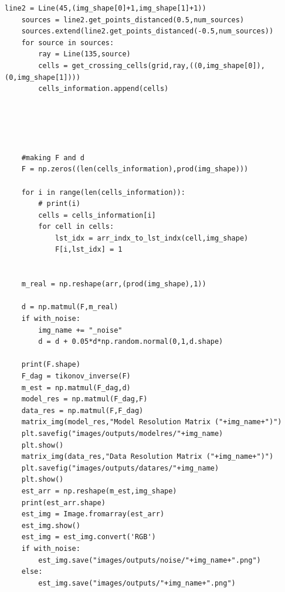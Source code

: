\documentclass{article}
\begin{document}
\begin{lstlisting}[style=python]
    line2 = Line(45,(img_shape[0]+1,img_shape[1]+1))
    sources = line2.get_points_distanced(0.5,num_sources)
    sources.extend(line2.get_points_distanced(-0.5,num_sources))
    for source in sources:
        ray = Line(135,source)
        cells = get_crossing_cells(grid,ray,((0,img_shape[0]),(0,img_shape[1])))
        cells_information.append(cells)





    #making F and d
    F = np.zeros((len(cells_information),prod(img_shape)))

    for i in range(len(cells_information)):
        # print(i)
        cells = cells_information[i] 
        for cell in cells:
            lst_idx = arr_indx_to_lst_indx(cell,img_shape)
            F[i,lst_idx] = 1


    m_real = np.reshape(arr,(prod(img_shape),1))

    d = np.matmul(F,m_real)
    if with_noise:
        img_name += "_noise"
        d = d + 0.05*d*np.random.normal(0,1,d.shape)

    print(F.shape)
    F_dag = tikonov_inverse(F)
    m_est = np.matmul(F_dag,d)
    model_res = np.matmul(F_dag,F)
    data_res = np.matmul(F,F_dag)
    matrix_img(model_res,"Model Resolution Matrix ("+img_name+")")
    plt.savefig("images/outputs/modelres/"+img_name)
    plt.show()
    matrix_img(data_res,"Data Resolution Matrix ("+img_name+")")
    plt.savefig("images/outputs/datares/"+img_name)
    plt.show()
    est_arr = np.reshape(m_est,img_shape)
    print(est_arr.shape)
    est_img = Image.fromarray(est_arr)
    est_img.show()
    est_img = est_img.convert('RGB')
    if with_noise:
        est_img.save("images/outputs/noise/"+img_name+".png")
    else:
        est_img.save("images/outputs/"+img_name+".png")

\end{lstlisting}
\end{document}
